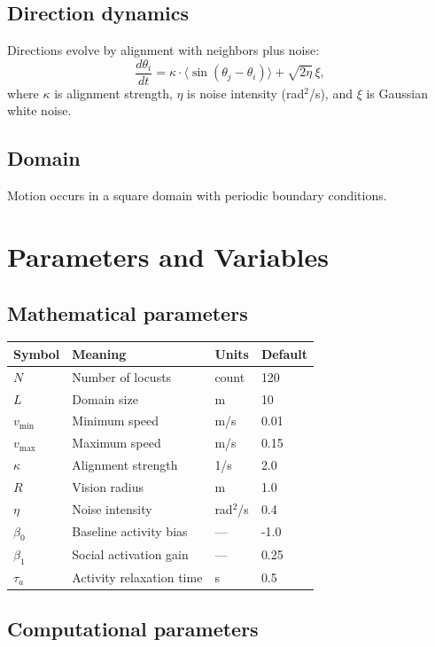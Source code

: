 \documentclass[11pt,a4paper]{article}
\begin{document}
\subsection{Direction dynamics}
Directions evolve by alignment with neighbors plus noise:
\[
\frac{d\theta_i}{dt} = \kappa \cdot \langle \sin(\theta_j - \theta_i)\rangle + \sqrt{2\eta}\,\xi,
\]
where $\kappa$ is alignment strength, $\eta$ is noise intensity (rad$^2$/s), and $\xi$ is Gaussian white noise.

\subsection{Domain}
Motion occurs in a square domain with periodic boundary conditions.

\section{Parameters and Variables}

\subsection{Mathematical parameters}

\begin{tabular}{@{}llll@{}}
\toprule
Symbol & Meaning & Units & Default \\
\midrule
$N$ & Number of locusts & count & 120 \\
$L$ & Domain size & m & 10 \\
$v_{\min}$ & Minimum speed & m/s & 0.01 \\
$v_{\max}$ & Maximum speed & m/s & 0.15 \\
$\kappa$ & Alignment strength & 1/s & 2.0 \\
$R$ & Vision radius & m & 1.0 \\
$\eta$ & Noise intensity & rad$^2$/s & 0.4 \\
$\beta_0$ & Baseline activity bias & --- & -1.0 \\
$\beta_1$ & Social activation gain & --- & 0.25 \\
$\tau_a$ & Activity relaxation time & s & 0.5 \\
\bottomrule
\end{tabular}

\subsection{Computational parameters}
\end{document}
